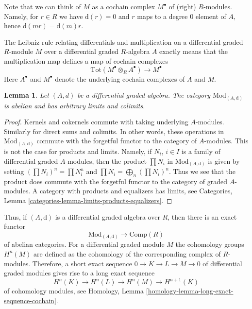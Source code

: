 \documentclass{stacks-project}
\theoremstyle{plain}
\newtheorem{lemma}[subsection]{Lemma}
\theoremstyle{definition}
\theoremstyle{remark}
\numberwithin{equation}{subsection}
\begin{document}
\noindent
Note that we can think of $M$ as a cochain complex $M^\bullet$
of (right) $R$-modules. Namely, for $r \in R$ we have $\text{d}(r) = 0$
and $r$ maps to a degree $0$ element of $A$, hence
$\text{d}(mr) = \text{d}(m)r$.

\medskip\noindent
The Leibniz rule relating differentials and multiplication on a differential
graded $R$-module $M$ over a differential graded $R$-algebra $A$
exactly means that the multiplication map defines a map of cochain complexes
$$
\text{Tot}(M^\bullet \otimes_R A^\bullet) \to M^\bullet
$$
Here $A^\bullet$ and $M^\bullet$ denote the underlying cochain complexes
of $A$ and $M$.

\begin{lemma}
\label{lemma-dgm-abelian}
Let $(A, d)$ be a differential graded algebra. The category
$\text{Mod}_{(A, \text{d})}$ is abelian and has arbitrary limits and colimits.
\end{lemma}

\begin{proof}
Kernels and cokernels commute with taking underlying $A$-modules.
Similarly for direct sums and colimits. In other words, these operations
in $\text{Mod}_{(A, \text{d})}$ commute with the forgetful functor to the
category of $A$-modules. This is not the case for products and limits.
Namely, if $N_i$, $i \in I$ is a family of
differential graded $A$-modules, then the product $\prod N_i$ in
$\text{Mod}_{(A, \text{d})}$ is given by setting $(\prod N_i)^n = \prod N_i^n$
and $\prod N_i = \bigoplus_n (\prod N_i)^n$. Thus we see that the product
does commute with the forgetful functor to the category of graded $A$-modules.
A category with products and equalizers has limits, see
Categories, Lemma \ref{categories-lemma-limits-products-equalizers}.
\end{proof}

\noindent
Thus, if $(A, \text{d})$ is a differential graded
algebra over $R$, then there is an exact functor
$$
\text{Mod}_{(A, \text{d})} \longrightarrow \text{Comp}(R)
$$
of abelian categories. For a differential graded module $M$ the
cohomology groups $H^n(M)$ are defined as the cohomology of the
corresponding complex of $R$-modules. Therefore, a short exact
sequence $0 \to K \to L \to M \to 0$ of differential graded modules
gives rise to a long exact sequence
\begin{equation}
\label{equation-les}
H^n(K) \to H^n(L) \to H^n(M) \to H^{n + 1}(K)
\end{equation}
of cohomology modules, see
Homology, Lemma \ref{homology-lemma-long-exact-sequence-cochain}.
\end{document}
